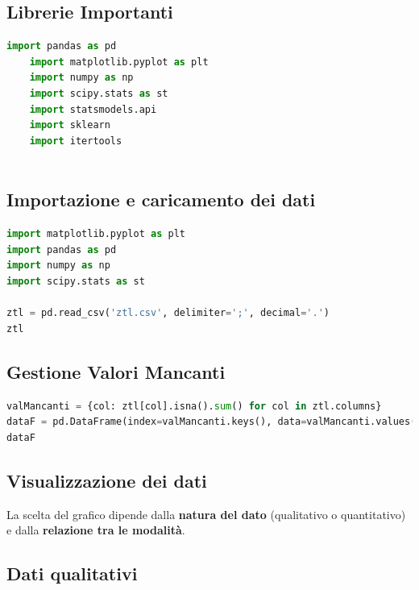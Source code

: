 \documentclass{article}
\begin{document}
\subsection*{Librerie Importanti}

\begin{lstlisting}[language=Python]
    import pandas as pd
    import matplotlib.pyplot as plt
    import numpy as np
    import scipy.stats as st
    import statsmodels.api
    import sklearn
    import itertools
    
\end{lstlisting}
\subsection*{Importazione e caricamento dei dati}

\begin{lstlisting}[language=Python]
import matplotlib.pyplot as plt
import pandas as pd
import numpy as np
import scipy.stats as st

ztl = pd.read_csv('ztl.csv', delimiter=';', decimal='.')
ztl
\end{lstlisting}

\subsection*{Gestione Valori Mancanti}

\begin{lstlisting}[language=Python]
valMancanti = {col: ztl[col].isna().sum() for col in ztl.columns}
dataF = pd.DataFrame(index=valMancanti.keys(), data=valMancanti.values(), columns=['Valori Mancanti'])
dataF
\end{lstlisting}

\subsection*{Visualizzazione dei dati}

La scelta del grafico dipende dalla \textbf{natura del dato} (qualitativo o quantitativo) e dalla \textbf{relazione tra le modalità}.

\subsection*{Dati qualitativi}
\end{document}

